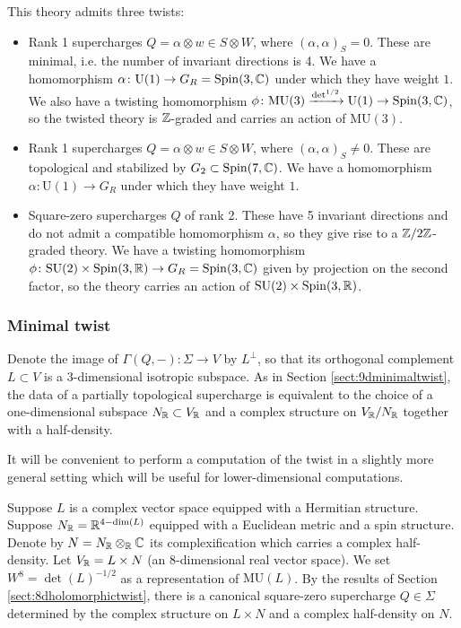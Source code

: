 \documentclass[10pt, oneside]{article}
\newcommand{\MU}{\mathrm{MU}}
\renewcommand{\U}{\mathrm{U}}
\begin{document}
This theory admits three twists:
\begin{itemize}
\item Rank 1 supercharges $Q=\alpha\otimes w\in S\otimes W$, where $(\alpha, \alpha)_S = 0$. These are minimal, i.e. the number of invariant directions is 4. We have a homomorphism $\alpha\colon \U(1)\rightarrow G_R=\Spin(3, \CC)$ under which they have weight $1$. We also have a twisting homomorphism $\phi\colon \MU(3)\xrightarrow{\det^{1/2}} \U(1)\rightarrow \Spin(3, \CC)$, so the twisted theory is $\mathbb Z$-graded and carries an action of $\MU(3)$.

\item Rank 1 supercharges $Q = \alpha \otimes w \in S \otimes W$, where $(\alpha, \alpha)_S\neq 0$. These are topological and stabilized by $G_2\subset \mathrm{Spin}(7, \mathbb C)$. We have a homomorphism $\alpha\colon \U(1)\rightarrow G_R$ under which they have weight $1$.

\item Square-zero supercharges $Q$ of rank 2. These have 5 invariant directions and do not admit a compatible homomorphism $\alpha$, so they give rise to a $\mathbb Z/2\mathbb Z$-graded theory. We have a twisting homomorphism $\phi\colon \mathrm{SU}(2)\times \mathrm{Spin}(3, \mathbb R)\rightarrow G_R=\mathrm{Spin}(3, \mathbb C)$ given by projection on the second factor, so the theory carries an action of $\mathrm{SU}(2)\times\mathrm{Spin}(3, \mathbb R)$.
\end{itemize}

\subsubsection{Minimal twist}
\label{sect:7dminimaltwist}

Denote the image of $\Gamma(Q, -)\colon \Sigma\rightarrow V$ by $L^\perp$, so that its orthogonal complement $L\subset V$ is a 3-dimensional isotropic subspace. As in Section \ref{sect:9dminimaltwist}, the data of a partially topological supercharge is equivalent to the choice of a one-dimensional subspace $N_\mathbb R\subset V_\mathbb R$ and a complex structure on $V_\mathbb R/N_\mathbb R$ together with a half-density.

It will be convenient to perform a computation of the twist in a slightly more general setting which will be useful for lower-dimensional computations.

Suppose $L$ is a complex vector space equipped with a Hermitian structure. Suppose $N_\mathbb R=\mathbb R^{4-\dim(L)}$ equipped with a Euclidean metric and a spin structure. Denote by $N=N_\mathbb R\otimes_\mathbb R\mathbb C$ its complexification which carries a complex half-density. Let $V_\mathbb R = L\times N$ (an 8-dimensional real vector space). We set $W^8=\det(L)^{-1/2}$ as a representation of $\MU(L)$. By the results of Section \ref{sect:8dholomorphictwist}, there is a canonical square-zero supercharge $Q\in\Sigma$ determined by the complex structure on $L\times N$ and a complex half-density on $N$.
\end{document}
